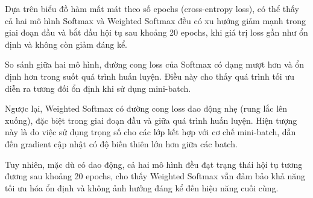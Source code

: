 Dựa trên biểu đồ hàm mất mát theo số epochs (cross-entropy loss), có thể thấy
cả hai mô hình Softmax và Weighted Softmax đều có xu hướng giảm mạnh trong giai
đoạn đầu và bắt đầu hội tụ sau khoảng 20 epochs, khi giá trị loss gần như ổn
định và không còn giảm đáng kể.

So sánh giữa hai mô hình, đường cong loss của Softmax có dạng mượt hơn và ổn
định hơn trong suốt quá trình huấn luyện. Điều này cho thấy quá trình tối ưu
diễn ra tương đối ổn định khi sử dụng mini-batch.

Ngược lại, Weighted Softmax có đường cong loss dao động nhẹ (rung lắc lên
xuống), đặc biệt trong giai đoạn đầu và giữa quá trình huấn luyện. Hiện tượng
này là do việc sử dụng trọng số cho các lớp kết hợp với cơ chế mini-batch, dẫn
đến gradient cập nhật có độ biến thiên lớn hơn giữa các batch.

Tuy nhiên, mặc dù có dao động, cả hai mô hình đều đạt trạng thái hội tụ tương
đương sau khoảng 20 epochs, cho thấy Weighted Softmax vẫn đảm bảo khả năng tối
ưu hóa ổn định và không ảnh hưởng đáng kể đến hiệu năng cuối cùng.
